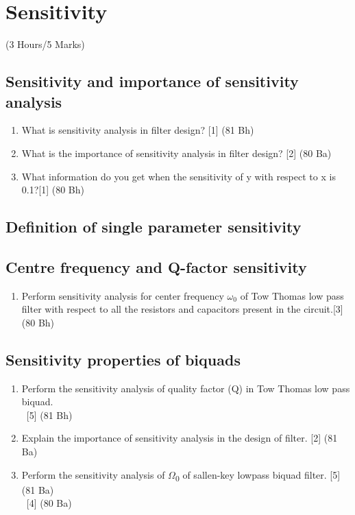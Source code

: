 \documentclass[12pt]{article}
\newcommand{\W}{\(\Omega\)}
\newcommand{\enter}{\\\textcolor{white}{1}}
\begin{document}
\pagebreak
\section{Sensitivity}
\begin{center}(3 Hours/5 Marks)\end{center}
\subsection{Sensitivity and importance of sensitivity analysis}
\begin{enumerate}
\item What is sensitivity analysis in filter design? \hfill [1] (81 Bh)
\item What is the importance of sensitivity analysis in filter design? \hfill[2] (80 Ba)
\item What information do you get when the sensitivity of y with respect to x is 0.1?\hfill [1] (80 Bh)
\end{enumerate}
\subsection{Definition of single parameter sensitivity}
\subsection{Centre frequency and Q-factor sensitivity}
\begin{enumerate}
\item Perform sensitivity analysis for center frequency $\omega_0$ of Tow Thomas low pass filter with respect to all the resistors and capacitors present in the circuit.\hfill[3] (80 Bh)
\end{enumerate}
\subsection{Sensitivity properties of biquads}
\begin{enumerate}
\item Perform the sensitivity analysis of quality factor (Q) in Tow Thomas low pass biquad.
\enter\hfill [5] (81 Bh)
\item Explain the importance of sensitivity analysis in the design of filter. \hfill[2] (81 Ba)
\item Perform the sensitivity analysis of \W\textsubscript{0} of sallen-key lowpass biquad filter. \hfill [5] (81 Ba)
\enter \hfill [4] (80 Ba)
\end{enumerate}
\end{document}
